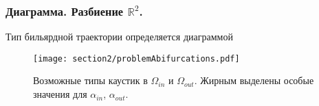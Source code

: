 \begin{frame}\frametitle{Диаграмма. Разбиение $\mathbb{R}^2$.}
\qq Тип бильярдной траектории определяется диаграммой
\begin{figure}[!htb]
\centering
\texttt{[image: section2/problemAbifurcations.pdf]}
    \caption{Возможные типы каустик в $\Omega_{in}$ и $\Omega_{out}$. Жирным выделены особые значения для $\alpha_{in}$, $\alpha_{out}$.}
    \label{fig:sect2_problemAbifurcations}
\end{figure}
\end{frame}






